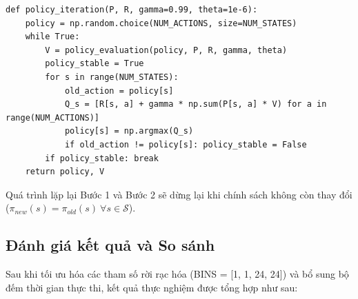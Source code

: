 \begin{lstlisting}[style=PythonStyle, caption={Policy Improvement}]
def policy_iteration(P, R, gamma=0.99, theta=1e-6):
    policy = np.random.choice(NUM_ACTIONS, size=NUM_STATES)
    while True:
        V = policy_evaluation(policy, P, R, gamma, theta)
        policy_stable = True
        for s in range(NUM_STATES):
            old_action = policy[s]
            Q_s = [R[s, a] + gamma * np.sum(P[s, a] * V) for a in range(NUM_ACTIONS)]
            policy[s] = np.argmax(Q_s)
            if old_action != policy[s]: policy_stable = False
        if policy_stable: break
    return policy, V
\end{lstlisting}Quá trình lặp lại Bước 1 và Bước 2 sẽ dừng lại khi chính sách không còn thay đổi ($\pi_{new}(s) = \pi_{old}(s) \ \forall s \in \mathcal{S}$).

\subsection{Đánh giá kết quả và So sánh}
Sau khi tối ưu hóa các tham số rời rạc hóa (BINS = [1, 1, 24, 24]) và bổ sung bộ đếm thời gian thực thi, kết quả thực nghiệm được tổng hợp như sau:

